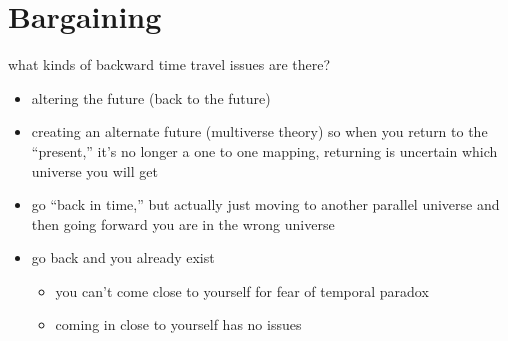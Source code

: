 \chapter*{Bargaining}

what kinds of backward time travel issues are there?

\begin{itemize}
    \item altering the future (back to the future)
    \item creating an alternate future (multiverse theory) so when you return to the ``present,'' it's no longer a one to one mapping, returning is uncertain which universe you will get
    \item go ``back in time,'' but actually just moving to another parallel universe and then going forward you are in the wrong universe
    \item go back and you already exist
    \begin{itemize}
        \item you can't come close to yourself for fear of temporal paradox
        \item coming in close to yourself has no issues
    \end{itemize}
\end{itemize}
